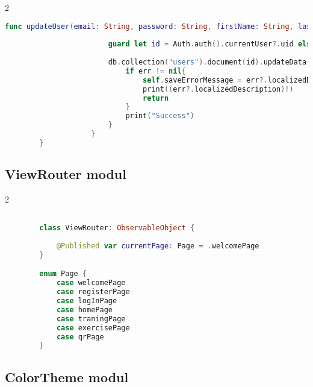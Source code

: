 \begin{spacing}{2}
\end{spacing}
\hspace*{-10mm}
\begin{minipage}{\textwidth}
    \linespread{0.8}\selectfont
    \begin{lstlisting}[language=swift]
        func updateUser(email: String, password: String, firstName: String, lastName: String) {
                        
                        guard let id = Auth.auth().currentUser?.uid else { return }
                        
                        db.collection("users").document(id).updateData(["email": email,"firstName": firstName,"lastName": lastName, "password": password]){ err in
                            if err != nil{
                                self.saveErrorMessage = err?.localizedDescription ?? ""
                                print((err?.localizedDescription)!)
                                return
                            }
                            print("Success")
                        }
                    }
        }
    \end{lstlisting}   
\end{minipage}

\subsection*{ViewRouter modul}

\begin{spacing}{2}
\end{spacing}
\begin{minipage}{\textwidth}
    \linespread{0.8}\selectfont
    \begin{lstlisting}[language=swift]

        class ViewRouter: ObservableObject {
            
            @Published var currentPage: Page = .welcomePage
        }

        enum Page {
            case welcomePage
            case registerPage
            case logInPage
            case homePage
            case traningPage
            case exercisePage
            case qrPage
        }
    \end{lstlisting}   
\end{minipage}  

\subsection*{ColorTheme modul}

